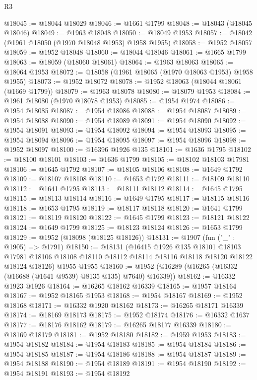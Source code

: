 \begin{lexlean}{R3}
\begin{coremodule}
@18045 := @18044 @18029
@18046 := @1661 @1799
@18048 := @18043 (@18045 @18046)
@18049 := @1963 @18048
@18050 := @18049 @1953
@18057 := @18042 (@1961 @18050 (@1970 @18048 @1953) @1958 @1955)
@18058 := @1952 @18057
@18059 := @1952 @18048
@18060 := @18044 @18046
@18061 := @1665 @1799
@18063 := @18059 (@18060 @18061)
@18064 := @1963 @18063
@18065 := @18064 @1953
@18072 := @18058 (@1961 @18065 (@1970 @18063 @1953) @1958 @1955)
@18073 := @1952 @18072
@18078 := @1952 @18063 (@18044 @18061 (@1669 @1799))
@18079 := @1963 @18078
@18080 := @18079 @1953
@18084 := @1961 @18080 (@1970 @18078 @1953)
@18085 := @1954 @1974
@18086 := @1954 @18085
@18087 := @1954 @18086
@18088 := @1954 @18087
@18089 := @1954 @18088
@18090 := @1954 @18089
@18091 := @1954 @18090
@18092 := @1954 @18091
@18093 := @1954 @18092
@18094 := @1954 @18093
@18095 := @1954 @18094
@18096 := @1954 @18095
@18097 := @1954 @18096
@18098 := @1952 @18097
@18100 := @16396 @1926 @135
@18101 := @1636 @1795
@18102 := @18100 @18101
@18103 := @1636 @1799
@18105 := @18102 @18103 @17981
@18106 := @1645 @1792
@18107 := @18105 @18106
@18108 := @1649 @1792
@18109 := @18107 @18108
@18110 := @1653 @1792
@18111 := @18109 @18110
@18112 := @1641 @1795
@18113 := @18111 @18112
@18114 := @1645 @1795
@18115 := @18113 @18114
@18116 := @1649 @1795
@18117 := @18115 @18116
@18118 := @1653 @1795
@18119 := @18117 @18118
@18120 := @1641 @1799
@18121 := @18119 @18120
@18122 := @1645 @1799
@18123 := @18121 @18122
@18124 := @1649 @1799
@18125 := @18123 @18124
@18126 := @1653 @1799
@18129 := @1952 (@18098 (@18125 @18126))
@18131 := @1907 (fun ("_" : @1905) => @1791)
@18150 := @18131
    (@16415
      @1926
      @135
      @18101
      @18103
      @17981
      @18106
      @18108
      @18110
      @18112
      @18114
      @18116
      @18118
      @18120
      @18122
      @18124
      @18126)
    @1955
    @1955
@18160 := @1952 (@16289 (@16265 (@16332 (@16688 (@1641 @9539) @8135 @135) @7640) @16339))
@18162 := @16332 @1923 @1926
@18164 := @16265 @18162 @16339
@18165 := @1957 @18164
@18167 := @1952 @18165 @1953
@18168 := @1954 @18167
@18169 := @1952 @18168
@18171 := @16332 @1920 @18162
@18173 := @16265 @18171 @16339
@18174 := @18169 @18173
@18175 := @1952 @18174
@18176 := @16332 @1637
@18177 := @18176 @18162
@18179 := @16265 @18177 @16339
@18180 := @18169 @18179
@18181 := @1952 @18180
@18182 := @1959 @1953
@18183 := @1954 @18182
@18184 := @1954 @18183
@18185 := @1954 @18184
@18186 := @1954 @18185
@18187 := @1954 @18186
@18188 := @1954 @18187
@18189 := @1954 @18188
@18190 := @1954 @18189
@18191 := @1954 @18190
@18192 := @1954 @18191
@18193 := @1954 @18192

\end{coremodule}
\end{lexlean}
